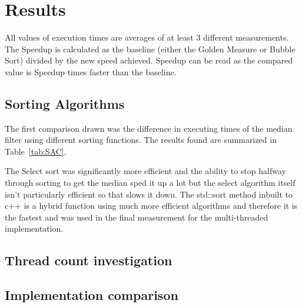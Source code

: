 \section{Results}

All values of execution times are averages of at least 3 different measurements. The Speedup is calculated as the baseline (either the Golden Measure or Bubble Sort) divided by the new speed achieved. Speedup can be read as the compared value is Speedup times faster than the baseline.

\subsection{Sorting Algorithms}

The first comparison drawn was the difference in executing times of the median filter using different sorting functions. The results found are summarized in Table~\ref{tab:SAC}.


The Select sort was significantly more efficient and the ability to stop halfway through sorting to get the median sped it up a lot but the select algorithm itself isn't particularly efficient so that slows it down.
The std::sort method inbuilt to c++ is a hybrid function using much more efficient algorithms and therefore it is the fastest and was used in the final measurement for the multi-threaded implementation. 

\subsection{Thread count investigation}



\subsection{Implementation comparison}

